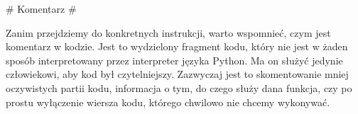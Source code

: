 \documentclass{article}
\author{Mykhailo Hulii}
\date{November 2022}
\begin{document}
	\newenvironment{Pytania}
	{
		\begin{list}
			{ \color{BurntOrange} Zadanie \arabic{ListCounter}:~}
			{
				\usecounter{ListCounter}
				\color{black}
			}
		}
		{
		\end{list}
	}
	\newenvironment{Odpowiedz}
	{
		\begin{list}
			{ \color{Red} Odpowiedź  \Roman{mycounter}:~}
			{
				\usecounter{mycounter}
				\color{black}
			}
		}
		{
		\end{list}
	}
	\newenvironment{Komentarz}
	{
		\begin{list}
			{ \color{RoyalPurple} {\#} Komentarz {\#}{\scshape}}
		}
		{
		\end{list}
	}
	
	\newenvironment{POdpowiedz}
	{
		\begin{list}
			{ \color{Green} {\*} Poprawna odpowiedź {\*}{\bfseries}}
		}  
		{
		\end{list}
	}
	\begin{Komentarz}
		\item Zanim przejdziemy do konkretnych instrukcji, warto wspomnieć, czym jest komentarz w kodzie. Jest to wydzielony fragment kodu, który nie jest w żaden sposób interpretowany przez interpreter języka Python. Ma on służyć jedynie człowiekowi, aby kod był czytelniejszy. Zazwyczaj jest to skomentowanie mniej oczywistych partii kodu, informacja o tym, do czego służy dana funkcja, czy po prostu wyłączenie wiersza kodu, którego chwilowo nie chcemy wykonywać.
	\end{Komentarz}
\end{document}
